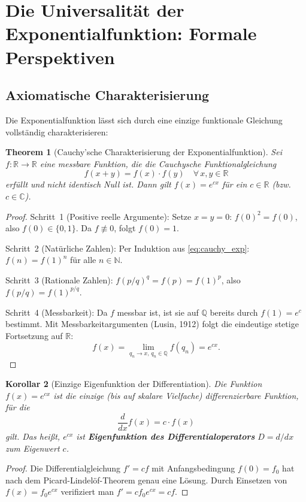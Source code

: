 ﻿\documentclass[12pt,a4paper]{article}
\newtheorem{theorem}{Theorem}[section]
\newtheorem{corollary}[theorem]{Korollar}
\theoremstyle{definition}
\theoremstyle{remark}
\begin{document}
\section{Die Universalität der Exponentialfunktion: Formale Perspektiven}
\label{sec:exponential_universal}

\subsection{Axiomatische Charakterisierung}

Die Exponentialfunktion lässt sich durch eine einzige funktionale Gleichung vollständig charakterisieren:

\begin{theorem}[Cauchy'sche Charakterisierung der Exponentialfunktion]
\label{thm:cauchy_exp}
Sei $f: \mathbb{R} \to \mathbb{R}$ eine messbare Funktion, die die Cauchysche Funktionalgleichung
\begin{equation}
f(x + y) = f(x)\cdot f(y) \quad \forall\, x,y \in \mathbb{R}
\label{eq:cauchy_exp}
\end{equation}
erfüllt und nicht identisch Null ist. Dann gilt $f(x) = e^{cx}$ für ein $c \in \mathbb{R}$ (bzw.\ $c \in \mathbb{C}$).
\end{theorem}
\begin{proof}
Schritt~1 (Positive reelle Argumente): Setze $x=y=0$: $f(0)^2 = f(0)$, also $f(0) \in \{0,1\}$. Da $f \not\equiv 0$, folgt $f(0) = 1$.

Schritt~2 (Natürliche Zahlen): Per Induktion aus \eqref{eq:cauchy_exp}: $f(n) = f(1)^n$ für alle $n \in \mathbb{N}$.

Schritt~3 (Rationale Zahlen): $f(p/q)^q = f(p) = f(1)^p$, also $f(p/q) = f(1)^{p/q}$.

Schritt~4 (Messbarkeit): Da $f$ messbar ist, ist sie auf $\mathbb{Q}$ bereits durch $f(1) = e^c$ bestimmt. Mit Messbarkeitargumenten (Lusin, 1912) folgt die eindeutige stetige Fortsetzung auf $\mathbb{R}$:
\[
f(x) = \lim_{q_n \to x,\, q_n \in \mathbb{Q}} f(q_n) = e^{cx}. 
\]
\end{proof}

\begin{corollary}[Einzige Eigenfunktion der Differentiation]
\label{cor:eigenfunktion}
Die Funktion $f(x) = e^{cx}$ ist die einzige (bis auf skalare Vielfache) differenzierbare Funktion, für die
\begin{equation}
\frac{d}{dx}f(x) = c\cdot f(x)
\end{equation}
gilt. Das heißt, $e^{cx}$ ist \textbf{Eigenfunktion des Differentialoperators} $D = d/dx$ zum Eigenwert $c$.
\end{corollary}
\begin{proof}
Die Differentialgleichung $f' = cf$ mit Anfangsbedingung $f(0) = f_0$ hat nach dem Picard-Lindelöf-Theorem genau eine Lösung. Durch Einsetzen von $f(x) = f_0 e^{cx}$ verifiziert man $f' = cf_0e^{cx} = cf$. 
\end{proof}
\end{document}
